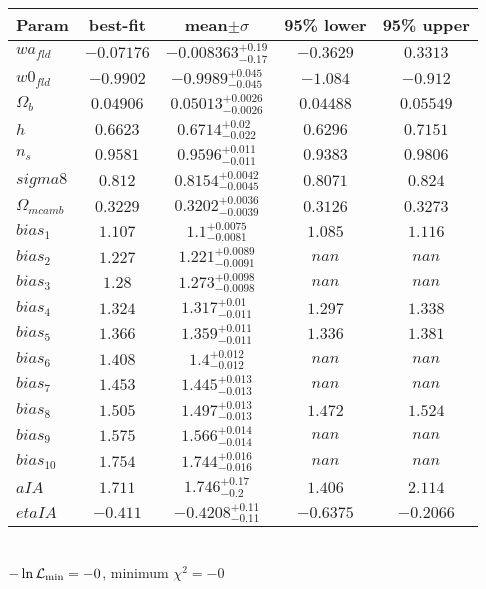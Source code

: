 \begin{tabular}{|l|c|c|c|c|} 
 \hline 
Param & best-fit & mean$\pm\sigma$ & 95\% lower & 95\% upper \\ \hline 
$wa_{fld }$ &$-0.07176$ & $-0.008363_{-0.17}^{+0.19}$ & $-0.3629$ & $0.3313$ \\ 
$w0_{fld }$ &$-0.9902$ & $-0.9989_{-0.045}^{+0.045}$ & $-1.084$ & $-0.912$ \\ 
$\Omega{}_{b }$ &$0.04906$ & $0.05013_{-0.0026}^{+0.0026}$ & $0.04488$ & $0.05549$ \\ 
$h$ &$0.6623$ & $0.6714_{-0.022}^{+0.02}$ & $0.6296$ & $0.7151$ \\ 
$n_{s }$ &$0.9581$ & $0.9596_{-0.011}^{+0.011}$ & $0.9383$ & $0.9806$ \\ 
$sigma8$ &$0.812$ & $0.8154_{-0.0045}^{+0.0042}$ & $0.8071$ & $0.824$ \\ 
$\Omega{}_{m camb }$ &$0.3229$ & $0.3202_{-0.0039}^{+0.0036}$ & $0.3126$ & $0.3273$ \\ 
$bias_{1 }$ &$1.107$ & $1.1_{-0.0081}^{+0.0075}$ & $1.085$ & $1.116$ \\ 
$bias_{2 }$ &$1.227$ & $1.221_{-0.0091}^{+0.0089}$ & $nan$ & $nan$ \\ 
$bias_{3 }$ &$1.28$ & $1.273_{-0.0098}^{+0.0098}$ & $nan$ & $nan$ \\ 
$bias_{4 }$ &$1.324$ & $1.317_{-0.011}^{+0.01}$ & $1.297$ & $1.338$ \\ 
$bias_{5 }$ &$1.366$ & $1.359_{-0.011}^{+0.011}$ & $1.336$ & $1.381$ \\ 
$bias_{6 }$ &$1.408$ & $1.4_{-0.012}^{+0.012}$ & $nan$ & $nan$ \\ 
$bias_{7 }$ &$1.453$ & $1.445_{-0.013}^{+0.013}$ & $nan$ & $nan$ \\ 
$bias_{8 }$ &$1.505$ & $1.497_{-0.013}^{+0.013}$ & $1.472$ & $1.524$ \\ 
$bias_{9 }$ &$1.575$ & $1.566_{-0.014}^{+0.014}$ & $nan$ & $nan$ \\ 
$bias_{10 }$ &$1.754$ & $1.744_{-0.016}^{+0.016}$ & $nan$ & $nan$ \\ 
$aIA$ &$1.711$ & $1.746_{-0.2}^{+0.17}$ & $1.406$ & $2.114$ \\ 
$etaIA$ &$-0.411$ & $-0.4208_{-0.11}^{+0.11}$ & $-0.6375$ & $-0.2066$ \\ 
\hline 
 \end{tabular} \\ 
$-\ln{\cal L}_\mathrm{min} =-0$, minimum $\chi^2=-0$ \\ 
